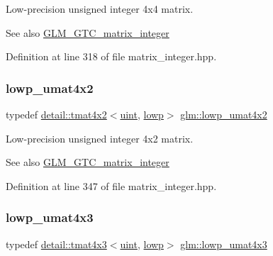 Low-\/precision unsigned integer 4x4 matrix. \begin{DoxySeeAlso}{See also}
\hyperlink{group__gtc__matrix__integer}{G\+L\+M\+\_\+\+G\+T\+C\+\_\+matrix\+\_\+integer} 
\end{DoxySeeAlso}


Definition at line 318 of file matrix\+\_\+integer.\+hpp.

\mbox{\label{group__gtc__matrix__integer_ga7583563f93096623d54ec8fddd806d13}} 
\subsubsection{\texorpdfstring{lowp\+\_\+umat4x2}{lowp\_umat4x2}}
{\footnotesize\ttfamily typedef \hyperlink{structglm_1_1detail_1_1tmat4x2}{detail\+::tmat4x2}$<$\hyperlink{group__core__precision_ga4fd29415871152bfb5abd588334147c8}{uint}, \hyperlink{namespaceglm_a0f04f086094c747d227af4425893f545ae161af3fc695e696ce3bf69f7332bc2d}{lowp}$>$ \hyperlink{group__gtc__matrix__integer_ga7583563f93096623d54ec8fddd806d13}{glm\+::lowp\+\_\+umat4x2}}

Low-\/precision unsigned integer 4x2 matrix. \begin{DoxySeeAlso}{See also}
\hyperlink{group__gtc__matrix__integer}{G\+L\+M\+\_\+\+G\+T\+C\+\_\+matrix\+\_\+integer} 
\end{DoxySeeAlso}


Definition at line 347 of file matrix\+\_\+integer.\+hpp.

\mbox{\label{group__gtc__matrix__integer_ga03af6e7ea92be81959305fc89a239cf5}} 
\subsubsection{\texorpdfstring{lowp\+\_\+umat4x3}{lowp\_umat4x3}}
{\footnotesize\ttfamily typedef \hyperlink{structglm_1_1detail_1_1tmat4x3}{detail\+::tmat4x3}$<$\hyperlink{group__core__precision_ga4fd29415871152bfb5abd588334147c8}{uint}, \hyperlink{namespaceglm_a0f04f086094c747d227af4425893f545ae161af3fc695e696ce3bf69f7332bc2d}{lowp}$>$ \hyperlink{group__gtc__matrix__integer_ga03af6e7ea92be81959305fc89a239cf5}{glm\+::lowp\+\_\+umat4x3}}


